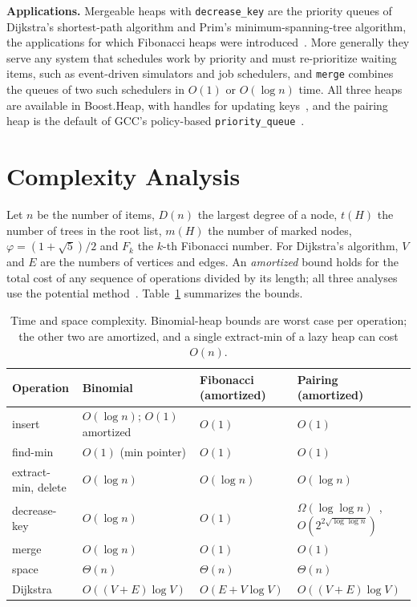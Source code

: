 \documentclass[acmsmall,nonacm]{acmart}
\newcommand{\code}[1]{\texttt{#1}}
\begin{document}
\textbf{Applications.} Mergeable heaps with \code{decrease\_key} are the
priority queues of Dijkstra's shortest-path algorithm and Prim's
minimum-spanning-tree algorithm, the applications for which Fibonacci heaps
were introduced~\cite{fredman1987}. More generally they serve any system that
schedules work by priority and must re-prioritize waiting items, such as
event-driven simulators and job schedulers, and \code{merge} combines the
queues of two such schedulers in $O(1)$ or $O(\log n)$ time. All three heaps
are available in Boost.Heap, with handles for updating keys~\cite{boostheap},
and the pairing heap is the default of GCC's policy-based
\code{priority\_queue}~\cite{gccpbds}.

\section{Complexity Analysis}
\label{sec:complexity}

Let $n$ be the number of items, $D(n)$ the largest degree of a node, $t(H)$ the
number of trees in the root list, $m(H)$ the number of marked nodes,
$\varphi = (1+\sqrt5)/2$ and $F_k$ the $k$-th Fibonacci number. For Dijkstra's
algorithm, $V$ and $E$ are the numbers of vertices and edges. An
\emph{amortized} bound holds for the total cost of any sequence of operations
divided by its length; all three analyses use the potential
method~\cite[\S{}17.3]{cormen2009}. Table~\ref{tab:complexity} summarizes the
bounds.

\begin{table}[t]
\caption{Time and space complexity. Binomial-heap bounds are worst case per operation; the other two are amortized, and a single extract-min of a lazy heap can cost $O(n)$.}
\label{tab:complexity}
\small
\begin{tabular}{@{}llll@{}}
\toprule
Operation & Binomial & Fibonacci (amortized) & Pairing (amortized) \\
\midrule
insert & $O(\log n)$; $O(1)$ amortized & $O(1)$ & $O(1)$~\cite{iacono2000} \\
find-min & $O(1)$ (min pointer) & $O(1)$ & $O(1)$ \\
extract-min, delete & $O(\log n)$ & $O(\log n)$ & $O(\log n)$~\cite{fredman1986} \\
decrease-key & $O(\log n)$ & $O(1)$ & $\Omega(\log\log n)$~\cite{fredman1999}, $O(2^{2\sqrt{\log\log n}})$~\cite{pettie2005} \\
merge & $O(\log n)$ & $O(1)$ & $O(1)$~\cite{iacono2000} \\
space & $\Theta(n)$ & $\Theta(n)$ & $\Theta(n)$ \\
Dijkstra & $O((V+E)\log V)$ & $O(E + V\log V)$ & $O((V+E)\log V)$ \\
\bottomrule
\end{tabular}
\end{table}
\end{document}
